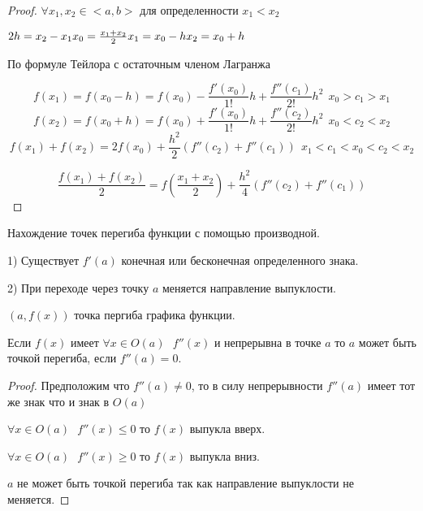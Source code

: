 \begin{proof}
  $\forall x_1,x_2 \in <a,b>$ для определенности $x_1 < x_2$

  $
  2h = x_2 - x_1\\
  x_0 = \frac{x_1 + x_2}{2}\\
  x_1 = x_0 - h\\
  x_2 = x_0 + h\\
  $

  По формуле Тейлора с остаточным членом Лагранжа

  $$
  f(x_1) = f(x_0 - h) = f(x_0) - \frac{f'(x_0)}{1!}h +
    \frac{f''(c_1)}{2!}h^2 ~~ x_0 > c_1 > x_1
  $$
  $$
  f(x_2) = f(x_0 + h) = f(x_0) + \frac{f'(x_0)}{1!}h +
    \frac{f''(c_2)}{2!}h^2 ~~ x_0 < c_2 < x_2
  $$
  $$
  f(x_1) + f(x_2) = 2f(x_0) + \frac{h^2}{2}(f''(c_2) + f''(c_1)) ~~
  x_1 < c_1 < x_0 < c_2 < x_2
  $$

  $$
  \frac{f(x_1) + f(x_2)}{2} = f(\frac{x_1 + x_2}{2})
  + \frac{h^2}{4}(f''(c_2) + f''(c_1))
  $$
\end{proof}

\begin{title}[\Large]
  Нахождение точек перегиба функции с помощью производной.
\end{title}

\begin{defin}
  1) Существует $f'(a)$ конечная или бесконечная определенного знака.

  2) При переходе через точку $a$ меняется направление выпуклости.

  $(a, f(x))$ точка пергиба графика функции.
\end{defin}


\begin{block}
  Если $f(x)$ имеет $\forall x \in O(a) ~~~ f''(x)$ и непрерывна в
  точке $a$ то $a$ может быть точкой перегиба, если $f''(a) = 0$.
\end{block}

\begin{proof}
  Предположим что $f''(a)\not= 0$, то в силу непрерывности $f''(a)$ имеет
  тот же знак что и знак в $O(a)$

  $\forall x \in O(a) ~~~ f''(x) \le 0$ то $f(x)$ выпукла вверх.

  $\forall x \in O(a) ~~~ f''(x) \ge 0$ то $f(x)$ выпукла вниз.

  $a$ не может быть точкой перегиба так как направление выпуклости не меняется.
\end{proof}

